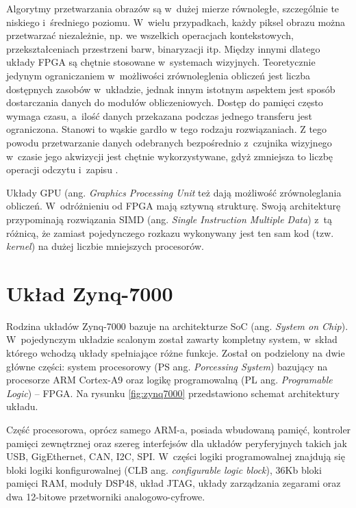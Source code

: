 Algorytmy przetwarzania obrazów są w~dużej mierze równoległe, szczególnie te niskiego i~średniego poziomu. 
W~wielu przypadkach, każdy piksel obrazu można przetwarzać niezależnie, np. we wszelkich operacjach kontekstowych, przekształceniach przestrzeni barw, binaryzacji itp. 
Między innymi dlatego układy FPGA są chętnie stosowane w~systemach wizyjnych. 
Teoretycznie jedynym ograniczaniem w~możliwości zrównoleglenia obliczeń jest liczba dostępnych zasobów w~układzie, jednak innym istotnym aspektem jest sposób dostarczania danych do modułów obliczeniowych.
Dostęp do pamięci często wymaga czasu, a~ilość danych przekazana podczas jednego transferu jest ograniczona. 
Stanowi to wąskie gardło w tego rodzaju rozwiązaniach.
Z tego powodu przetwarzanie danych odebranych bezpośrednio z~czujnika wizyjnego w~czasie jego akwizycji jest chętnie wykorzystywane, gdyż zmniejsza to liczbę operacji odczytu i~zapisu \cite{garcia2014survey}.

Układy GPU (ang. \textit{Graphics Processing Unit} też dają możliwość zrównoleglania obliczeń. 
W~odróżnieniu od FPGA mają sztywną strukturę. 
Swoją architekturę przypominają rozwiązania SIMD (ang. \textit{Single Instruction Multiple Data}) z~tą różnicą, że zamiast pojedynczego rozkazu wykonywany jest ten sam kod (tzw. \textit{kernel}) na dużej liczbie mniejszych procesorów.

\section{Układ Zynq-7000}

Rodzina układów Zynq-7000 bazuje na architekturze SoC (ang. \textit{System on Chip}). 
W~pojedynczym układzie scalonym został zawarty kompletny system, w~skład którego wchodzą układy spełniające różne funkcje. 
Został on podzielony na dwie główne części: system procesorowy (PS ang. \textit{Porcessing System}) bazujący na procesorze ARM Cortex-A9 oraz logikę programowalną (PL ang. \textit{Programable Logic}) -- FPGA. 
Na rysunku \ref{fig:zynq7000} przedstawiono schemat architektury układu.

Część procesorowa, oprócz samego ARM-a, posiada wbudowaną pamięć, kontroler pamięci zewnętrznej oraz szereg interfejsów dla układów peryferyjnych takich jak USB, GigEthernet, CAN, I2C, SPI. 
W~części logiki programowalnej znajdują się bloki logiki konfigurowalnej (CLB ang. \textit{configurable logic block}), 36Kb bloki pamięci RAM, moduły DSP48, układ JTAG, układy zarządzania zegarami oraz dwa 12-bitowe przetworniki analogowo-cyfrowe.

